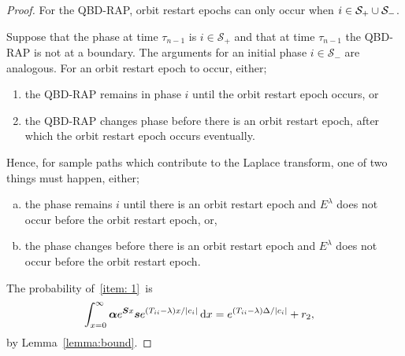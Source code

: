 \begin{proof}
	For the QBD-RAP, orbit restart epochs can only occur when \(i\in\mathcal S_+\cup\mathcal{S}_-\). 
	
	Suppose that the phase at time \(\tau_{n-1}\) is \(i\in\mathcal S_+\) and that at time \(\tau_{n-1}\) the QBD-RAP is not at a boundary. The arguments for an initial phase \(i\in\mathcal S_-\) are analogous. For an orbit restart epoch to occur, either; 
	\begin{enumerate}
		\item the QBD-RAP remains in phase \(i\) until the orbit restart epoch occurs, or
		\item the QBD-RAP changes phase before there is an orbit restart epoch, after which the orbit restart epoch occurs eventually. 
	\end{enumerate}
	
	Hence, for sample paths which contribute to the Laplace transform, one of two things must happen, either; 
	\begin{enumerate}[a)]
		\item the phase remains \(i\) until there is an orbit restart epoch and \(E^\lambda\) does not occur before the orbit restart epoch, or, \label{item: 1}
		\item the phase changes before there is an orbit restart epoch and \(E^\lambda\) does not occur before the orbit restart epoch. \label{item: 2}
	\end{enumerate}
	
	The probability of~\ref{item: 1}~is 
	\begin{align}
		\int_{x=0}^\infty \boldsymbol \alpha e^{\boldsymbol{S}x}\boldsymbol s e^{(T_{ii}-\lambda)x/|c_i|}\, \mathrm{d} x 
		&= e^{(T_{ii}-\lambda)\Delta/|c_i|} + r_2,\label{eqn: bnd this 12345}
	\end{align}
	by Lemma~\ref{lemma:bound}.
	

\end{proof}
